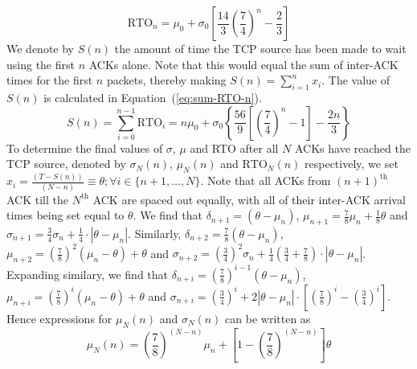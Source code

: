 \documentclass[conference]{IEEEtran}
\begin{document}
\begin{equation}
  \label{eq:RTO-n}
  \text{RTO}_n = \mu_0 + \sigma_0 \left[ \frac{14}{3} \left(\frac{7}{4}\right)^n - \frac{2}{3}\right]
\end{equation}
We denote by $S(n)$ the amount of time the TCP source has been made to wait using the first $n$ ACKs alone. Note that this would equal the sum of inter-ACK times for the first $n$ packets, thereby making $S(n) = \sum_{i=1}^n x_i$. The value of $S(n)$ is calculated in Equation~(\ref{eq:sum-RTO-n}).
\begin{equation}
  \label{eq:sum-RTO-n}
  S(n) =  \sum_{i=0}^{n-1} \text{RTO}_i = n \mu_0 + \sigma_0 \left\{ \frac{56}{9} \left[ \left(\frac{7}{4}\right)^n - 1\right] - \frac{2n}{3}\right\} 
\end{equation}
To determine the final values of $\sigma$, $\mu$ and RTO after all $N$ ACKs have reached the TCP source, denoted by $\sigma_N(n)$, $\mu_N(n)$ and $\text{RTO}_N(n)$ respectively, we set $x_i = \frac{(T-S(n))}{(N-n)} \equiv \theta; \forall i \in \{n+1, \ldots, N\}$. Note that all ACKs from $(n+1)^\text{th}$ ACK till the $N^\text{th}$ ACK are spaced out equally, with all of their inter-ACK arrival times being set equal to $\theta$. We find that $\delta_{n+1} = (\theta - \mu_n)$, $\mu_{n+1} = \frac{7}{8}\mu_n + \frac{1}{8}\theta$ and $\sigma_{n+1} = \frac{3}{4}\sigma_n + \frac{1}{4} \cdot |\theta - \mu_n|$. Similarly, $\delta_{n+2} = \frac{7}{8}(\theta - \mu_n)$, $\mu_{n+2} = \left(\frac{7}{8}\right)^2(\mu_n - \theta) + \theta$ and $\sigma_{n+2} = \left(\frac{3}{4}\right)^2 \sigma_n + \frac{1}{4} \left(\frac{3}{4} + \frac{7}{8}\right) \cdot |\theta - \mu_n|$. Expanding similary, we find that $\delta_{n+i} = \left(\frac{7}{8}\right)^{i-1} (\theta - \mu_n)$, $\mu_{n+i} = \left(\frac{7}{8}\right)^i (\mu_n - \theta) + \theta$ and $\sigma_{n+i} = \left(\frac{3}{4}\right)^i + 2 |\theta - \mu_n| \cdot \left[\left(\frac{7}{8}\right)^i - \left(\frac{3}{4}\right)^i\right]$. Hence expressions for $\mu_N(n)$ and $\sigma_N(n)$ can be written as
\begin{equation}
  \label{eq:mu-N}
  \mu_N(n) = \left(\frac{7}{8}\right)^{(N-n)} \mu_n + \left[ 1 - \left( \frac{7}{8}\right)^{(N-n)}\right] \theta
\end{equation}
\end{document}
